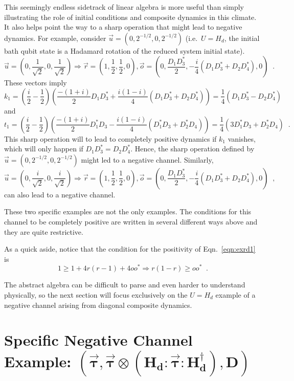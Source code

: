 This seemingly endless sidetrack of linear algebra is more useful than simply illustrating the role of initial conditions and composite dynamics in this climate.  It also helps point the way to a sharp operation that might lead to negative dynamics.  For example, consider $\vec{u}=(0,2^{-1/2},0,2^{-1/2})$ (i.e.\ $U=H_d$, the initial bath qubit state is a Hadamard rotation of the reduced system initial state).  
$$
\vec{u} = \left(0,\frac{1}{\sqrt{2}},0,\frac{1}{\sqrt{2}}\right) \Rightarrow \vec{r} = \left(1,\frac{1}{2},\frac{1}{2},0\right),\vec{o}=\left(0,\frac{D_1D_3^*}{2},-\frac{i}{4}\left(D_1D_3^*+D_2D_4^*\right),0\right)\;\;.
$$
These vectors imply 
$$
k_1 = \left(\frac{i}{2}-\frac{1}{2}\right)\left(\frac{-(1+i)}{2}D_1D_3^*+\frac{i(1-i)}{4}\left(D_1D_3^*+D_2D_4^*\right)\right) = \frac{1}{4} \left(D_1 D_3^* - D_2 D_4^*\right)
$$
and
$$
t_1 = \left(\frac{i}{2}-\frac{1}{2}\right)\left(\frac{-(1+i)}{2}D_1^* D_3-\frac{i(1-i)}{4}\left(D_1^*D_3+D_2^*D_4\right)\right) = \frac{1}{4} \left(3 D_1^* D_3 + D_2^* D_4\right)\;\;.
$$
This sharp operation will to lead to completely positive dynamics if $k_1$ vanishes, which will only happen if $D_1D_3^*=D_2D_4^*$.  Hence, the sharp operation defined by $\vec{u}=(0,2^{-1/2},0,2^{-1/2})$ might led to a negative channel.  Similarly,
$$
\vec{u} = \left(0,\frac{i}{\sqrt{2}},0,\frac{i}{\sqrt{2}}\right) \Rightarrow \vec{r} = \left(1,\frac{1}{2},\frac{1}{2},0\right),\vec{o}=\left(0,\frac{D_1D_3^*}{2},-\frac{i}{4}\left(D_1D_3^*+D_2D_4^*\right),0\right)\;\;,
$$
can also lead to a negative channel.  

These two specific examples are not the only examples.  The conditions for this channel to be completely positive are written in several different ways above and they are quite restrictive.  

As a quick aside, notice that the condition for the positivity of Eqn.\ \ref{eqn:exrd1} is
$$
1 \ge 1 + 4 r(r-1) + 4 o o^*\Rightarrow r(1-r)\ge oo^*\;\;.
$$

The abstract algebra can be difficult to parse and even harder to understand physically, so the next section will focus exclusively on the $U=H_d$ example of a negative channel arising from diagonal composite dynamics.  

\section{Specific Negative Channel Example: $\mathbf{(\vec{\tau},\vec{\tau}\otimes \left( H_d:\vec{\tau}:H_d^\dagger\right),D)}$}
\label{sec:negexample}

